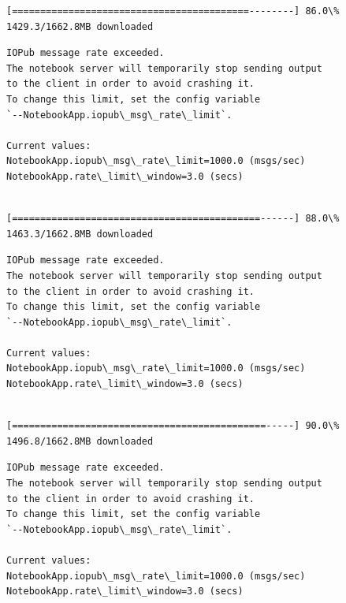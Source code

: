 \documentclass[11pt]{article}
\begin{document}
    \begin{Verbatim}[commandchars=\\\{\}]
[==========================================--------] 86.0\% 1429.3/1662.8MB downloaded
    \end{Verbatim}

    \begin{Verbatim}[commandchars=\\\{\}]
IOPub message rate exceeded.
The notebook server will temporarily stop sending output
to the client in order to avoid crashing it.
To change this limit, set the config variable
`--NotebookApp.iopub\_msg\_rate\_limit`.

Current values:
NotebookApp.iopub\_msg\_rate\_limit=1000.0 (msgs/sec)
NotebookApp.rate\_limit\_window=3.0 (secs)


    \end{Verbatim}

    \begin{Verbatim}[commandchars=\\\{\}]
[============================================------] 88.0\% 1463.3/1662.8MB downloaded
    \end{Verbatim}

    \begin{Verbatim}[commandchars=\\\{\}]
IOPub message rate exceeded.
The notebook server will temporarily stop sending output
to the client in order to avoid crashing it.
To change this limit, set the config variable
`--NotebookApp.iopub\_msg\_rate\_limit`.

Current values:
NotebookApp.iopub\_msg\_rate\_limit=1000.0 (msgs/sec)
NotebookApp.rate\_limit\_window=3.0 (secs)


    \end{Verbatim}

    \begin{Verbatim}[commandchars=\\\{\}]
[=============================================-----] 90.0\% 1496.8/1662.8MB downloaded
    \end{Verbatim}

    \begin{Verbatim}[commandchars=\\\{\}]
IOPub message rate exceeded.
The notebook server will temporarily stop sending output
to the client in order to avoid crashing it.
To change this limit, set the config variable
`--NotebookApp.iopub\_msg\_rate\_limit`.

Current values:
NotebookApp.iopub\_msg\_rate\_limit=1000.0 (msgs/sec)
NotebookApp.rate\_limit\_window=3.0 (secs)


    \end{Verbatim}
\end{document}
